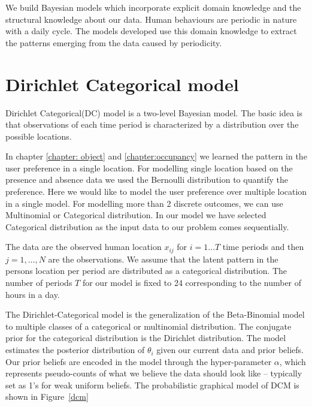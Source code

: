 We build Bayesian models which incorporate explicit domain knowledge and the structural knowledge about our data. Human behaviours are periodic in nature with a daily cycle. The models developed use this domain knowledge to extract the patterns emerging from the data caused by periodicity.

\section{Dirichlet Categorical model }

Dirichlet Categorical(DC) model  is a two-level Bayesian model. The basic idea is that observations of each time period is characterized by a distribution over the possible locations.

In chapter \ref{chapter: object} and \ref{chapter:occupancy} we learned the pattern in the user preference in a single location. For modelling single location based on the presence and absence data we used the Bernoulli distribution to quantify the preference. Here we would like to model the user preference over multiple location in a single model. For modelling more than 2 discrete outcomes, we can use Multinomial or Categorical distribution. In our model we have selected Categorical distribution as the input data to our problem comes sequentially. 

The data are the observed human location $x_{ij}$ for $i = 1 \dots T$ time periods and then $j = 1, \dots , N$  are the observations.  We assume that the latent pattern in the persons location per period are distributed as a categorical distribution. The number of periods $T$ for our model is fixed to 24 corresponding to the number of hours in a day. 

The Dirichlet-Categorical model is the generalization of the Beta-Binomial model to multiple classes of a categorical or multinomial distribution. The conjugate prior for the categorical distribution is the Dirichlet distribution. The model estimates the posterior distribution of $\theta_i$ given our current data and prior beliefs. Our prior beliefs are encoded in the model through the hyper-parameter $\alpha$, which represents pseudo-counts of what we believe the data should look like – typically set as 1's for weak uniform beliefs. The probabilistic graphical model of  DCM is shown in Figure~\ref{dcm}


